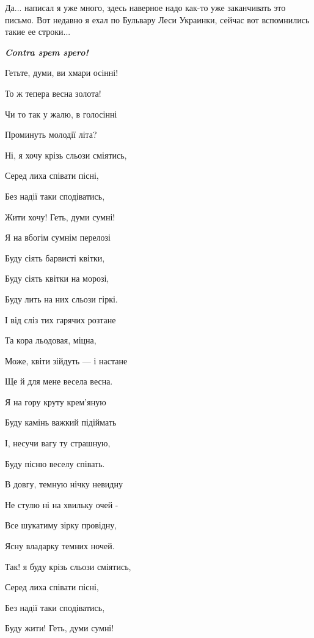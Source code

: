 Да... написал я уже много, здесь наверное надо как-то уже заканчивать это письмо.
Вот недавно я ехал по Бульвару Леси Украинки, сейчас вот вспомнились такие ее строки...

\raggedcolumns
\begin{multicols}{2} %
\setlength{\parindent}{0pt}
\begingroup
\bfseries\em\color{blue} Contra spem spero!\par
\endgroup
\smallskip
Гетьте, думи, ви хмари осінні!\par
То ж тепера весна золота!\par
Чи то так у жалю, в голосінні\par
Проминуть молодії літа?\par
\smallskip\par
Ні, я хочу крізь сльози сміятись,\par
Серед лиха співати пісні,\par
Без надії таки сподіватись,\par
Жити хочу! Геть, думи сумні!\par
\smallskip\par
Я на вбогім сумнім перелозі\par
Буду сіять барвисті квітки,\par
Буду сіять квітки на морозі,\par
Буду лить на них сльози гіркі.\par
\smallskip\par
І від сліз тих гарячих розтане\par
Та кора льодовая, міцна,\par
Може, квіти зійдуть — і настане\par
Ще й для мене весела весна.\par
\smallskip\par
Я на гору круту крем'яную\par
Буду камінь важкий підіймать\par
І, несучи вагу ту страшную,\par
Буду пісню веселу співать.\par
\smallskip\par
В довгу, темную нічку невидну\par
Не стулю ні на хвильку очей -\par
Все шукатиму зірку провідну,\par
Ясну владарку темних ночей.\par
\smallskip\par
Так! я буду крізь сльози сміятись,\par
Серед лиха співати пісні,\par
Без надії таки сподіватись,\par
Буду жити! Геть, думи сумні!\par
\end{multicols} %


